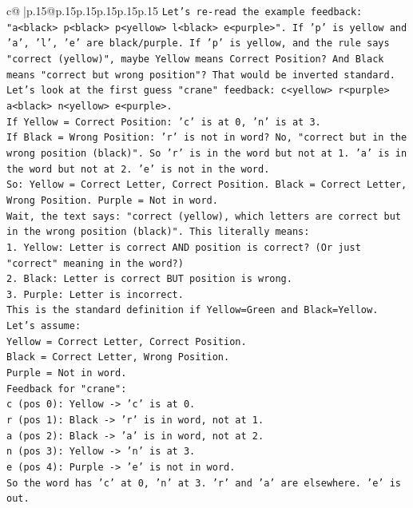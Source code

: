 \documentclass{article}
\begin{document}
{\begin{supertabular}{c@{$\;$}|p{.15\linewidth}@{}p{.15\linewidth}p{.15\linewidth}p{.15\linewidth}p{.15\linewidth}p{.15\linewidth}}
{{{\texttt{Let's re{-}read the example feedback: "a<black> p<black> p<yellow> l<black> e<purple>". If 'p' is yellow and 'a', 'l', 'e' are black/purple. If 'p' is yellow, and the rule says "correct (yellow)", maybe Yellow means Correct Position? And Black means "correct but wrong position"? That would be inverted standard.} \\
\texttt{Let's look at the first guess "crane" feedback: c<yellow> r<purple> a<black> n<yellow> e<purple>.} \\
\texttt{If Yellow = Correct Position: 'c' is at 0, 'n' is at 3.} \\
\texttt{If Black = Wrong Position: 'r' is not in word? No, "correct but in the wrong position (black)". So 'r' is in the word but not at 1. 'a' is in the word but not at 2. 'e' is not in the word.} \\
\texttt{So: Yellow = Correct Letter, Correct Position. Black = Correct Letter, Wrong Position. Purple = Not in word.} \\
\texttt{Wait, the text says: "correct (yellow), which letters are correct but in the wrong position (black)". This literally means:} \\
\texttt{1. Yellow: Letter is correct AND position is correct? (Or just "correct" meaning in the word?)} \\
\texttt{2. Black: Letter is correct BUT position is wrong.} \\
\texttt{3. Purple: Letter is incorrect.} \\
\texttt{This is the standard definition if Yellow=Green and Black=Yellow.} \\
\texttt{Let's assume:} \\
\texttt{Yellow = Correct Letter, Correct Position.} \\
\texttt{Black = Correct Letter, Wrong Position.} \\
\texttt{Purple = Not in word.} \\
\texttt{Feedback for "crane":} \\
\texttt{c (pos 0): Yellow {-}> 'c' is at 0.} \\
\texttt{r (pos 1): Black {-}> 'r' is in word, not at 1.} \\
\texttt{a (pos 2): Black {-}> 'a' is in word, not at 2.} \\
\texttt{n (pos 3): Yellow {-}> 'n' is at 3.} \\
\texttt{e (pos 4): Purple {-}> 'e' is not in word.} \\
\texttt{So the word has 'c' at 0, 'n' at 3. 'r' and 'a' are elsewhere. 'e' is out.} \\
}}}
\end{supertabular}}
\end{document}
